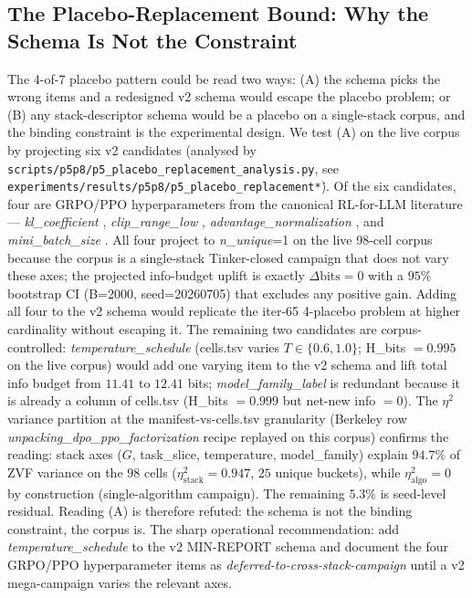 \documentclass{article}  \usepackage[preprint,nonatbib]{neurips_2026} \usepackage[numbers]{natbib}
\begin{document}
\subsection{The Placebo-Replacement Bound: Why the Schema Is Not the Constraint}
\label{sec:p5-placebo-bound}
The 4-of-7 placebo pattern could be read two ways: (A) the schema picks
the wrong items and a redesigned v2 schema would escape the placebo
problem; or (B) any stack-descriptor schema would be a placebo on a
single-stack corpus, and the binding constraint is the experimental
design. We test (A) on the live corpus by projecting six v2 candidates
(analysed by
\texttt{scripts/p5p8/p5\_placebo\_replacement\_analysis.py}, see
\texttt{experiments/results/p5p8/p5\_placebo\_replacement\.*}). Of the
six candidates, four are GRPO/PPO hyperparameters from the canonical
RL-for-LLM literature --- \textit{kl\_coefficient}
\citep{schulman2017proximal, lambert2024tulu3}, \textit{clip\_range\_low}
\citep{schulman2017proximal}, \textit{advantage\_normalization}
\citep{shao2024deepseekmath, yu2025dapo}, and
\textit{mini\_batch\_size} \citep{ivison2024unpacking, lambert2024tulu3}.
All four project to \emph{n\_unique}=1 on the live 98-cell corpus
because the corpus is a single-stack Tinker-closed campaign that does
not vary these axes; the projected info-budget uplift is exactly
$\Delta\text{bits} = 0$ with a $95\%$ bootstrap CI (B=2000,
seed=20260705) that excludes any positive gain. Adding all four to the
v2 schema would replicate the iter-65 4-placebo problem at higher
cardinality without escaping it. The remaining two candidates are
corpus-controlled: \textit{temperature\_schedule} (cells.tsv varies
$T \in \{0.6, 1.0\}$; H\_bits $= 0.995$ on the live corpus) would add
one varying item to the v2 schema and lift total info budget from
$11.41$ to $12.41$ bits; \textit{model\_family\_label} is redundant
because it is already a column of cells.tsv (H\_bits $= 0.999$ but
net-new info $= 0$). The $\eta^2$ variance partition at the
manifest-vs-cells.tsv granularity (Berkeley row
\textit{unpacking\_dpo\_ppo\_factorization} recipe replayed on this
corpus) confirms the reading: stack axes ($G$, task\_slice,
temperature, model\_family) explain $94.7\%$ of ZVF variance on the
$98$ cells ($\eta^2_{\text{stack}} = 0.947$, $25$ unique buckets),
while $\eta^2_{\text{algo}} = 0$ by construction (single-algorithm
campaign). The remaining $5.3\%$ is seed-level residual. Reading (A)
is therefore refuted: the schema is not the binding constraint, the
corpus is. The sharp operational recommendation: add
\textit{temperature\_schedule} to the v2 MIN-REPORT schema and
document the four GRPO/PPO hyperparameter items as
\textit{deferred-to-cross-stack-campaign} until a v2 mega-campaign
varies the relevant axes.
\end{document}
